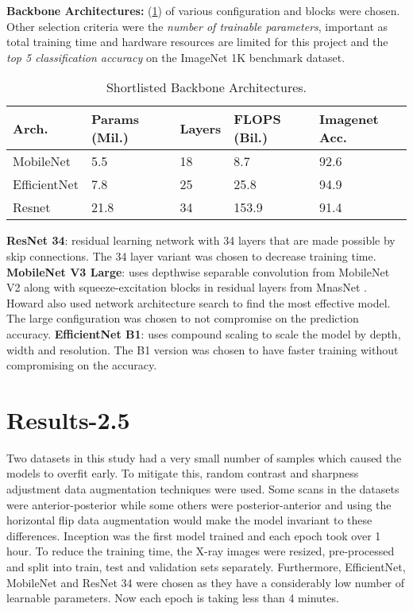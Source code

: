 \documentclass[10pt,twocolumn,letterpaper]{article}
\begin{document}
\textbf{Backbone Architectures:} (\cref{tab:selArch}) of various configuration and blocks were chosen. Other selection criteria were the \textit{number of trainable parameters}, important as total training time and hardware resources are limited for this project and the \textit{top 5 classification accuracy} on the ImageNet 1K benchmark dataset.
\begin{table}
  \centering
  \begin{tabular}{p{1.7cm}|p{1cm}|p{1cm}|p{1cm}|p{1cm}}
  \toprule
  Arch. & Params (Mil.) & Layers & FLOPS (Bil.) & Imagenet Acc.\\
  \midrule
  MobileNet & 5.5 & 18 & 8.7 & 92.6\\
  \midrule
  EfficientNet & 7.8 & 25 & 25.8 & 94.9\\
  \midrule
  Resnet & 21.8 & 34 & 153.9 & 91.4\\
  \bottomrule
  \end{tabular}
  \caption{Shortlisted Backbone Architectures.}
  \vspace{-1.5em}
  \label{tab:selArch}
\end{table}
\textbf{ResNet 34}: residual learning network with 34 layers that are made possible by skip connections. The 34 layer variant was chosen to decrease training time. \cite{he2016deep}
\textbf{MobileNet V3 Large}: uses depthwise separable convolution from MobileNet V2 \cite{sandler2018mobilenetv2} along with squeeze-excitation blocks in residual layers from MnasNet \cite{tan2019mnasnet}. Howard \etal \cite{howard2019searching} also used network architecture search to find the most effective model. The large configuration was chosen to not compromise on the prediction accuracy.
\textbf{EfficientNet B1}: uses compound scaling to scale the model by depth, width and resolution. The B1 version was chosen to have faster training without compromising on the accuracy. \cite{tan2019efficientnet}
\section{Results-2.5} 
\label{sec:method}
Two datasets in this study had a very small number of samples which caused the models to overfit early. To mitigate this, random contrast and sharpness adjustment \cite{nanni2021comparison} data augmentation techniques were used. Some scans in the datasets were anterior-posterior while some others were posterior-anterior and using the horizontal flip data augmentation would make the model invariant to these differences\cite{botev2022regularising}.
Inception was the first model trained and each epoch took over 1 hour. To reduce the training time, the X-ray images were resized, pre-processed and split into train, test and validation sets separately. Furthermore, EfficientNet, MobileNet and ResNet 34 were chosen as they have a considerably low number of learnable parameters. Now each epoch is taking less than 4 minutes. 
\end{document}
